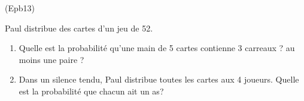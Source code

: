 \begin{tiny}(Epb13)\end{tiny} Paul distribue des cartes d'un jeu de 52.
\begin{enumerate}
  \item Quelle est la probabilité qu'une main de 5 cartes contienne 3 carreaux ? au moins une paire ?
  \item Dans un silence tendu, Paul distribue toutes les cartes aux 4 joueurs. Quelle est la probabilité que chacun ait un as?
\end{enumerate} 